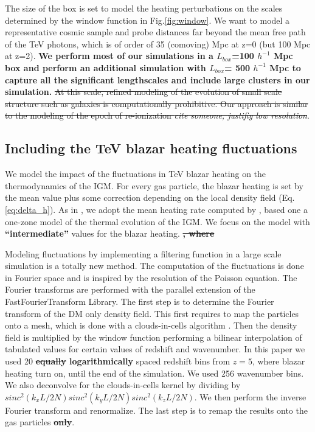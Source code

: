 \documentclass[twocolumns]{emulateapj}
\newcommand\ALc[1]{{\color{red} \bf #1}} %
\begin{document}
The size of the box is set to model the heating perturbations on the scales determined by the window function in Fig.\ref{fig:window}. We want to model a representative cosmic sample and probe distances far beyond the mean free path of the TeV photons, which is of order of 35 (comoving) Mpc at z=0 (but 100 Mpc at z=2). \ALc{We perform most of our simulations in a $L_{box}$=100 $h^{-1}$ Mpc box and perform an additional simulation with $L_{box}$= 500 $h^{-1}$ Mpc to capture all the significant lengthscales and include large clusters in our simulation.} \sout{At this scale, refined modeling of the evolution of small scale structure such as galaxies is computationally prohibitive. Our approach is similar to the modeling of the epoch of re-ionization \textit{cite someone, justifiy low resolution}}.

\subsection{Including the TeV blazar heating fluctuations}
We model the impact of the fluctuations in TeV blazar heating on the thermodynamics of the IGM. For every gas particle, the blazar heating is set by the mean value plus some correction depending on the local density field (Eq. \ref{eq:delta_h}). As in \citet{2012MNRAS.423..149P}, we adopt the mean heating rate computed by \citet{2012ApJ...752...23C}, based one a one-zone model of the thermal evolution of the IGM. We focus on the model with \ALc{``intermediate''} values for the blazar heating.\ALc{\sout{, where }}

Modeling fluctuations by implementing a filtering function in a large scale simulation is a totally new method. The computation of the fluctuations is done in Fourier space and is inspired by the resolution of the Poisson equation. The Fourier transforms are performed with the parallel extension of the FastFourierTransform Library. The first step is to determine the Fourier transform of the DM only density field. This first requires to map the particles onto a mesh, which is done with a clouds-in-cells algorithm \citep{1981csup.book.....H}. Then the density field is  multiplied by the window function performing a bilinear interpolation of tabulated values for certain values of redshift and wavenumber. In this paper we used 20 \ALc{\sout{equally} logarithmically} spaced redshift bins from $z=5$, where blazar heating turn on, until the end of the simulation. We used 256 wavenumber bins. We also deconvolve for the clouds-in-cells kernel by dividing by $sinc^2(k_xL/2N)sinc^2(k_yL/2N)sinc^2(k_zL/2N)$. We then perform the inverse Fourier transform and renormalize. The last step is to remap the results onto the gas particles \ALc{\sout{only}}.
\end{document}
